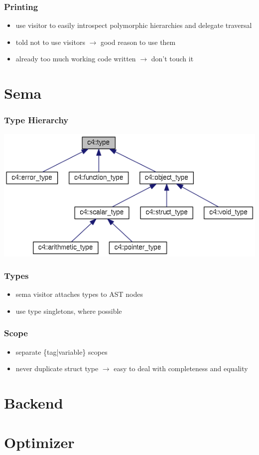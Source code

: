 \documentclass{beamer}
\begin{document}
\begin{frame}
  \frametitle{Printing}
  \begin{itemize}
  \item use visitor to easily introspect polymorphic hierarchies and
    delegate traversal
  \item told not to use visitors $\rightarrow$ good reason to use them
  \item already too much working code written $\rightarrow$ don't touch it
  \end{itemize}
\end{frame}

\section{Sema}
\begin{frame}
  \frametitle{Type Hierarchy}
  \includegraphics[scale=0.5]{type_hier}
\end{frame}

\begin{frame}
  \frametitle{Types}
  \begin{itemize}
  \item sema visitor attaches types to AST nodes
  \item use type singletons, where possible
  \end{itemize}
\end{frame}


\begin{frame}
  \frametitle{Scope}
  \begin{itemize}
  \item separate \{tag|variable\} scopes
  \item never duplicate struct type $\rightarrow$ easy to deal with completeness and equality
  \end{itemize}
\end{frame}

\section{Backend}
\begin{frame}
\end{frame}

\section{Optimizer}
\begin{frame}
\end{frame}
\end{document}

